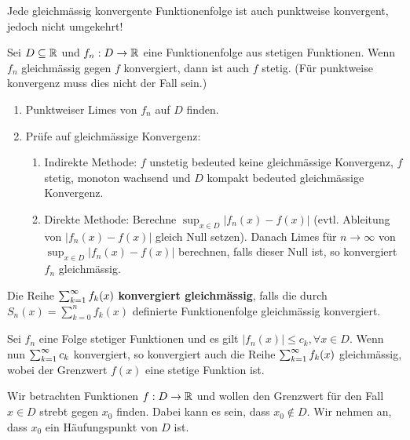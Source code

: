 \Bem Jede gleichmässig konvergente Funktionenfolge ist auch punktweise konvergent, jedoch nicht 
umgekehrt!

\Satz Sei $D \subseteq \mathbb{R}$ und $f_n : D \to \mathbb{R}$ eine Funktionenfolge aus stetigen Funktionen.
Wenn $f_n$ gleichmässig gegen $f$ konvergiert, dann ist auch $f$ stetig. (Für punktweise konvergenz
muss dies nicht der Fall sein.)



\begin{enumerate}[label=(\arabic*)]
    \item Punktweiser Limes von $f_n$ auf $D$ finden.
    \item Prüfe auf gleichmässige Konvergenz:
        \begin{enumerate}[label=(\roman*)]
            \item Indirekte Methode: $f$ unstetig bedeuted keine gleichmässige Konvergenz, $f$ stetig,
            monoton wachsend und $D$ kompakt bedeuted gleichmässige Konvergenz.
            \item Direkte Methode: Berechne $\sup_{x \in D} |f_n(x) - f(x)|$ (evtl. Ableitung von 
            $|f_n(x) - f(x)|$ gleich Null setzen). Danach Limes für $n \to \infty$ von $\sup_{x \in D} |f_n(x) - f(x)|$
            berechnen, falls dieser Null ist, so konvergiert $f_n$ gleichmässig.
        \end{enumerate}
\end{enumerate}



\Def Die Reihe $\sum_{k = 1}^{\infty} f_k(x)$ \textbf{konvergiert gleichmässig}, falls die durch $S_n(x) = \sum_{k=0}^{n} f_k(x)$
definierte Funktionenfolge gleichmässig konvergiert.

\begin{tcolorbox}
    \Satz Sei $f_n$ eine Folge stetiger Funktionen und es gilt $|f_n(x)| \leq c_k, \forall x \in D$.
    Wenn nun $\sum_{k = 1}^{\infty} c_k$ konvergiert, so konvergiert auch die Reihe $\sum_{k = 1}^{\infty} f_k(x)$ gleichmässig,
    wobei der Grenzwert $f(x)$ eine stetige Funktion ist.
\end{tcolorbox}


\columnbreak



Wir betrachten Funktionen $f : D \to \mathbb{R}$ und wollen den Grenzwert für den Fall $x \in D$ strebt gegen
$x_0$ finden. Dabei kann es sein, dass $x_0 \notin D$. Wir nehmen an, dass $x_0$ ein Häufungspunkt 
von $D$ ist.

